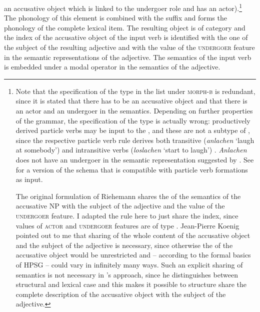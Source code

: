 \documentclass[output=paper,biblatex,babelshorthands,newtxmath,draftmode,colorlinks,citecolor=brown]{langscibook}
\begin{document}
an accusative object which is linked to the undergoer role  and has an actor).\footnote{
  Note that the specification of the type  in the list under \textsc{morph-b} is
  redundant, since it is stated that there has to be an accusative object and that there is an actor
  and an undergoer in the semantics. Depending on further properties of the grammar, the
  specification of the type is actually wrong: productively derived particle verbs may be input to
  the \bard, and these are not a subtype of , since the respective particle verb rule
  derives both transitive (\emph{anlachen} `laugh at somebody')  and intransitive verbs
  (\emph{loslachen} `start to laugh') \citep[]{Mueller2003a}. \emph{Anlachen} does not have an
  undergoer in the semantic representation suggested by \citet{Stiebels96a}. See
  \citet[]{Mueller2003a} for a version of the \bard schema that is compatible with particle verb
  formations as input.

  The original formulation of Riehemann shares the \contv of the semantics of the accusative NP
  with the subject of the adjective and the value of the \textsc{undergoer} feature. I adapted the
  rule here to just share the index, since values of \textsc{actor} and \textsc{undergoer} features
  are of type . Jean-Pierre Koenig pointed out to me that sharing of the whole content
  of the accusative object and the subject of the adjective is necessary, since otherwise the \contv
  of the accusative object would be unrestricted and -- according to the formal basics of HPSG --
  could vary in infinitely many ways. Such an explicit sharing of semantics is not necessary in
  \citeauthor{Mueller2003a}'s approach, since he distinguishes between structural and lexical case
   and this makes it possible to structure share the complete description of
  the accusative object with the subject of the adjective.
}
The phonology of this element  is combined with the suffix  and forms the
phonology of the complete lexical item. The resulting object is of category  and the
index of the accusative object of the input verb  is identified with the one of the subject
of the resulting adjective and with the value of the \textsc{undergoer} feature in the semantic
representations of the adjective. The semantics of the
input verb  is embedded under a modal operator in the semantics of the adjective.
\end{document}
